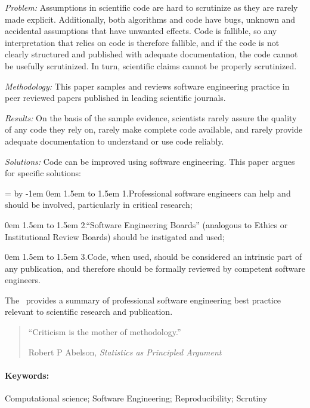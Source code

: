 \noindent\emph{Problem:} Assumptions in scientific code are hard to scrutinize as they are rarely made explicit. Additionally, both algorithms and code have bugs, unknown and accidental assumptions that have unwanted effects. Code is fallible, so any interpretation that relies on code is therefore fallible, and if the code is not clearly structured and published with adequate documentation, the code cannot be usefully scrutinized. In turn, scientific claims cannot be properly scrutinized.

\noindent\emph{Methodology:} This paper samples and reviews software engineering practice in peer reviewed papers published in leading scientific journals. 

\noindent\emph{Results:} On the basis of the sample evidence, scientists rarely assure the quality of any code they rely on, rarely make complete code available, and rarely provide adequate documentation to understand or use code reliably.

\noindent\emph{Solutions:} Code can be improved using software engineering. This paper argues for specific solutions:

\newdimen \mywidth \mywidth=\textwidth
\advance \mywidth by -1em
 0em \textwidth 1.5em \mywidth 
\noindent 
\hbox to 1.5em{ 1.\hfill}Professional software engineers can help and should be involved, particularly in critical research; 

 0em \textwidth 1.5em \mywidth 
\noindent 
\hbox to 1.5em{ 2.\hfill}``Software Engineering Boards'' (analogous to Ethics or Institutional Review Boards) should be instigated and used; 

 0em \textwidth 1.5em \mywidth 
\noindent 
\hbox to 1.5em{ 3.\hfill}Code, when used, should be considered an intrinsic part of any publication, and therefore should be formally reviewed by competent software engineers. 

\noindent
The \supplement\ provides a summary of professional software engineering best practice relevant to scientific research and publication.


\vfill\begin{quote}
\hfill``Criticism is the mother of methodology.''
 
\hfill Robert P Abelson, \emph{Statistics as Principled Argument\/} \cite{abelson}\end{quote}
\vfill
\paragraph*{Keywords:} 
Computational science; Software Engineering; Reproducibility; Scrutiny

